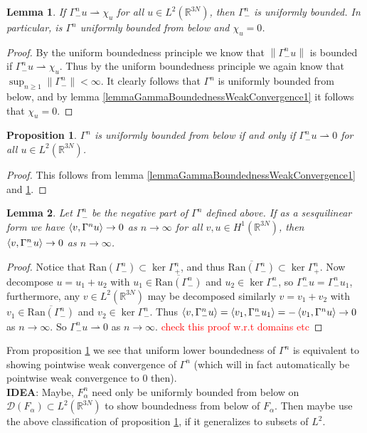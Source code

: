 \documentclass[a4paper,11pt]{article}
\newcommand{\norm}[1]{\left\lVert #1 \right\rVert}
\newcommand{\dom}[1]{\mathscr D\left(#1\right)}
\newcommand{\Ran}[1]{\text{Ran}\left(#1\right)}
\newcommand{\R}{\mathbb{R}}
\newtheorem{proposition}{Proposition}
\newtheorem{lemma}{Lemma}
\numberwithin{equation}{section}
\begin{document}
	\begin{lemma}\label{lemmaGammaBoundednessWeakConvergence2}
		If $ \Gamma^n_- u\rightharpoonup\chi_u $ for all $ u\in L^2(\R^{3N}) $, then $ \Gamma^n_- $ is uniformly bounded. In particular, is $ \Gamma^n $ uniformly bounded from below and $ \chi_u=0 $.
	\end{lemma}
	\begin{proof}
		By the uniform boundedness principle we know that $ \norm{\Gamma^n_- u }$ is bounded if $ \Gamma^n_- u\rightharpoonup\chi_u $. Thus by the uniform boundedness principle we again know that $ \sup_{n\geq1}\norm{\Gamma^n_-}<\infty $. It clearly follows that $ \Gamma^n $ is uniformly bounded from below, and by lemma \ref{lemmaGammaBoundednessWeakConvergence1} it follows that $ \chi_u=0 $.
	\end{proof}
	\begin{proposition}\label{propositionUniformLowerBoundiffWeakConvergence}
		$ \Gamma^n $ is uniformly bounded from below if and only if $ \Gamma^n_-u\rightharpoonup0 $ for all $ u\in L^2(\R^{3N}) $.
	\end{proposition}
	\begin{proof}
		This follows from lemma \ref{lemmaGammaBoundednessWeakConvergence1} and \ref{lemmaGammaBoundednessWeakConvergence2}.
	\end{proof}
	\begin{lemma}\label{lemmaGammaNegativePartPointwiseUniformBounded}
		Let $ \Gamma^n_- $ be the negative part of $ \Gamma^n $ defined above. If as a sesquilinear form we have $ \braket{v,\Gamma^n u}\to0 $ as $ n\to\infty $ for all  $v,u\in H^1(\R^{3N})$, then  $ \braket{v,\Gamma^n_- u}\to0 $ as $ n\to\infty $.
	\end{lemma}
	\begin{proof}
	 Notice that $ \Ran{\Gamma_-^n}\subset\ker\Gamma^n_+ $, and thus $ \overline{\Ran{\Gamma_-^n}}\subset\ker\Gamma^n_+ $. Now decompose $ u=u_1+u_2 $ with $ u_1\in\overline{\Ran{\Gamma^n_-}} $ and $ u_2\in\ker\Gamma^n_- $, so $ \Gamma^n_-u=\Gamma_-^n u_1 $, furthermore, any $ v\in L^2(\R^{3N}) $ may be decomposed similarly $ v=v_1+v_2 $ with $ v_1\in\overline{\Ran{\Gamma^n_-}} $ and $ v_2\in\ker\Gamma^n_- $. Thus $ \braket{v,\Gamma^n_-u}=\braket{v_1,\Gamma^n_-u_1}=-\braket{v_1,\Gamma^n u}\to0 $ as $ n\to\infty $. So $ \Gamma^n_-u\rightharpoonup 0 $ as $ n\to\infty $. \textcolor{red}{check this proof w.r.t domains etc}
	\end{proof}
	From proposition \ref{propositionUniformLowerBoundiffWeakConvergence} we see that uniform lower boundedness of $ \Gamma^n $ is equivalent to showing pointwise weak convergence of $ \Gamma^n $ (which will in fact automatically be pointwise weak convergence to $ 0 $ then). \\
	\textbf{IDEA}: Maybe, $ F_\alpha^n $ need only be uniformly bounded from below on $   \dom{F_\alpha}\subset L^2(\R^{3N}) $ to show boundedness from below of $ F_\alpha $. Then maybe use the above classification of proposition \ref{propositionUniformLowerBoundiffWeakConvergence}, if it generalizes to subsets of $ L^2 $.
\appendix
\end{document}
